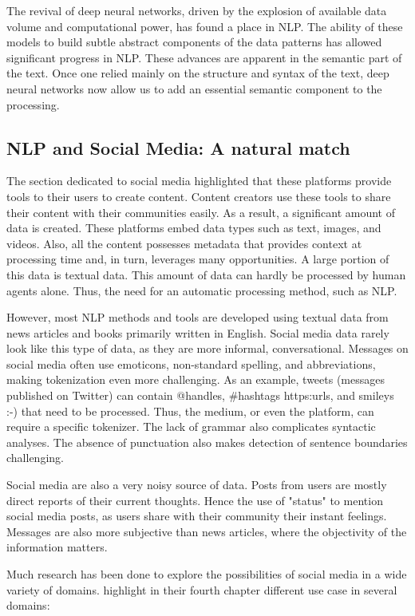 The revival of deep neural networks, driven by the explosion of available data volume and computational power, has found a place in NLP.
The ability of these models to build subtle abstract components of the data patterns has allowed significant progress in NLP.
These advances are apparent in the semantic part of the text.
Once one relied mainly on the structure and syntax of the text, deep neural networks now allow us to add an essential semantic component to the processing.

\subsection{NLP and Social Media: A natural match}
The section dedicated to social media highlighted that these platforms provide tools to their users to create content.
Content creators use these tools to share their content with their communities easily.
As a result, a significant amount of data is created.
These platforms embed data types such as text, images, and videos.
Also, all the content possesses metadata that provides context at processing time and, in turn, leverages many opportunities.
A large portion of this data is textual data.
This amount of data can hardly be processed by human agents alone.
Thus, the need for an automatic processing method, such as NLP.

However, most NLP methods and tools are developed using textual data from news articles and books primarily written in English.
Social media data rarely look like this type of data, as they are more informal, conversational.
Messages on social media often use emoticons, non-standard spelling, and abbreviations, making tokenization even more challenging.
As an example, tweets (messages published on Twitter) can contain @handles, \#hashtags https:\/\/urls, and smileys :-) that need to be processed.
Thus, the medium, or even the platform, can require a specific tokenizer.
The lack of grammar also complicates syntactic analyses.
The absence of punctuation also makes detection of sentence boundaries challenging.

Social media are also a very noisy source of data.
Posts from users are mostly direct reports of their current thoughts.
Hence the use of "status" to mention social media posts, as users share with their community their instant feelings.
Messages are also more subjective than news articles, where the objectivity of the information matters.

Much research has been done to explore the possibilities of social media in a wide variety of domains.
highlight in their fourth chapter different use case in several domains:

